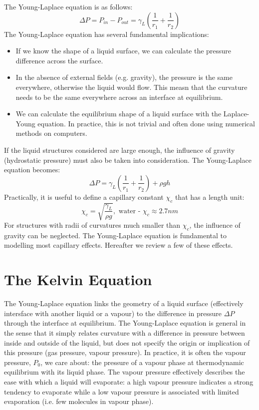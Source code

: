 \documentclass[a4paper, 11pt, normalem]{report}
\begin{document}
The Young-Laplace equation is as follows:
\begin{equation}
    \Delta P = P_{in} - P_{out} = \gamma_L \left(\frac{1}{r_1} + \frac{1}{r_2}\right)
\end{equation}
The Young-Laplace equation has several fundamental implications:
\begin{itemize}
    \item If we know the shape of a liquid surface, we can calculate the pressure difference across the surface.
    \item In the absence of external fields (e.g. gravity), the pressure is the same everywhere, otherwise the liquid would flow.
        This measn that the curvature needs to be the same everywhere across an interface at equilibrium.
    \item We can calculate the equilibrium shape of a liquid surface with the Laplace-Young equation.
        In practice, this is not trivial and often done using numerical methods on computers.
\end{itemize}
If the liquid structures considered are large enough, the influence of gravity (hydrostatic pressure) must also be taken into consideration.
The Young-Laplace equation becomes:
\begin{equation}
    \Delta P = \gamma_L \left(\frac{1}{r_1} + \frac{1}{r_2}\right) + \rho gh
\end{equation}
Practically, it is useful to define a capillary constant $\chi_c$ that has a length unit:
\begin{equation}
    \chi_c = \sqrt{\frac{\gamma_L}{\rho g}}, \text{ water - }\chi_c \approx 2.7nm
\end{equation}
For structures with radii of curvatures much smaller than $\chi_c$, the influence of gravity can be neglected.
The Young-Laplace equation is fundamental to modelling most capillary effects.
Hereafter we review a few of these effects.

\section{The Kelvin Equation}
The Young-Laplace equation links the geometry of a liquid surface (effectively intersface with another liquid or a vapour) to the difference in pressure $\Delta P$ through the interface at equilibrium.
The Young-Laplace equation is general in the sense that it simply relates curvature with a difference in pressure between inside and outside of the liquid, but does not specify the origin or implication of this pressure (gas pressure, vapour pressure).
In practice, it is often the vapour pressure, $P_0$, we care about: the pressure of a vapour phase at thermodynamic equilibrium with its liquid phase.
The vapour pressure effectively describes the ease with which a liquid will evaporate: a high vapour pressure indicates a strong tendency to evaporate while a low vapour pressure is associated with limited evaporation (i.e. few molecules in vapour phase).
\end{document}
